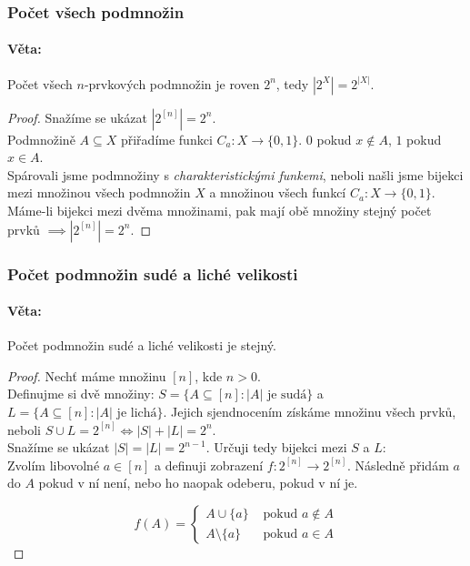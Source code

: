\documentclass[10pt,a4paper]{article}
\begin{document}
\subsubsection{Počet všech podmnožin}
\paragraph*{Věta: } Počet všech $n$-prvkových podmnožin je roven $2^n$, tedy $\left | 2^X \right | = 2^{|X|}$.

\begin{proof} Snažíme se ukázat $\left |2^{[n]}\right | = 2^n$.\\
    Podmnožině $A\subseteq X$ přiřadíme funkci $C_a: X \to \{0, 1\}$. $0$ pokud $x\notin A$, $1$ pokud $x\in A$.\\
    Spárovali jsme podmnožiny s \textit{charakteristickými funkemi}, neboli našli jsme bijekci mezi množinou všech podmnožin $X$ a množinou všech funkcí $C_a:X\to \{0,1\}$.\\
    Máme-li bijekci mezi dvěma množinami, pak mají obě množiny stejný počet prvků $\implies \left |2^{[n]}\right | = 2^n$.
\end{proof}

\subsubsection{Počet podmnožin sudé a liché velikosti}
\paragraph*{Věta: } Počet podmnožin sudé a liché velikosti je stejný.

\begin{proof} Nechť máme množinu $[n]$, kde $n>0$.\\
    Definujme si dvě množiny: $S=\{A\subseteq [n] : |A| \text{ je sudá}\}$ a $L=\{A\subseteq [n] : |A| \text{ je lichá}\}$. Jejich sjendnocením získáme množinu všech prvků, neboli $S \cup L = 2^{[n]} \iff |S| + |L| = 2^n$.\\
    Snažíme se ukázat $|S| = |L| = 2^{n-1}$. Určuji tedy bijekci mezi $S$ a $L$:\\
    Zvolím libovolné $a \in [n]$ a definuji zobrazení $f:2^{[n]}\to 2^{[n]}$. Následně přidám $a$ do $A$ pokud v ní není, nebo ho naopak odeberu, pokud v ní je.

    \[
        f(A) =
        \begin{cases}
            A\cup\{a\} &\text{ pokud } a\notin A\\
            A\setminus \{a\} &\text{ pokud } a\in A
        \end{cases}
    \]
\end{proof}
\end{document}
